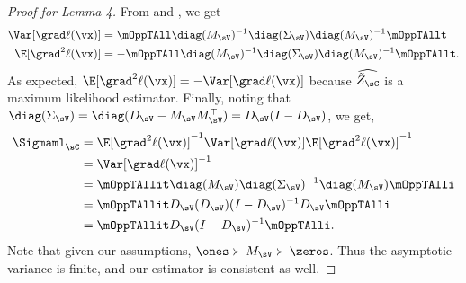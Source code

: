 \begin{proof}[Proof for Lemma 4]
From  and , we get
  \begin{align*}
    \Var [\grad \ell(\vx)] &= \mOppTAll \diag(M_\sV)^{-1} \diag(\Sigma_\sV) \diag(M_\sV)^{-1} \mOppTAllt \\
    \E[\grad^2 \ell(\vx)] &= -\mOppTAll \diag(M_\sV)^{-1} \diag(\Sigma_\sV) \diag(M_\sV)^{-1} \mOppTAllt.
  \end{align*}
As expected, $\E[\grad^2 \ell(\vx)] = -\Var [\grad \ell(\vx)]$ because $\widehat{\tilde Z_\sC}$ is a maximum likelihood estimator. 
Finally, noting that $\diag(\Sigma_\sV) = \diag(D_\sV - M_\sV
M_\sV^\top) = D_\sV (I - D_\sV)$, we get,
\begin{align*}
    \Sigmaml_{\sC} 
      &= \E[\grad^2 \ell(\vx)]^{-1} \Var [\grad \ell(\vx)] \E[\grad^2 \ell(\vx)]^{-1} \\
      &= \Var[\grad \ell(\vx)]^{-1} \\
      &= \mOppTAllit \diag(M_\sV) \diag(\Sigma_\sV)^{-1} \diag(M_\sV) \mOppTAlli \\
      &= \mOppTAllit D_\sV (D_\sV)(I-D_\sV)^{-1} D_\sV \mOppTAlli \\
      &= \mOppTAllit D_\sV (I - D_\sV)^{-1} \mOppTAlli.
\end{align*}
Note that given our assumptions, $\ones \succ M_\sV \succ \zeros$. Thus
the asymptotic variance is finite, and our estimator is consistent as
well.

% 


\end{proof}
